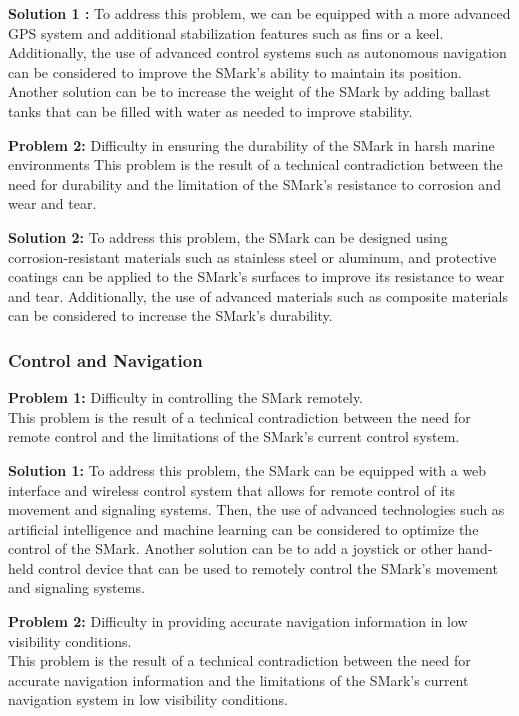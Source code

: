 \documentclass[12pt, twoside]{report}
\begin{document}
\textbf{Solution 1 :} To address this problem, we can be equipped with a more advanced GPS system and additional stabilization features such as fins or a keel. Additionally, the use of advanced control systems such as autonomous navigation can be considered to improve the SMark’s ability to maintain its position. Another solution can be to increase the weight of the SMark by adding ballast tanks that can be filled with water as needed to improve stability.

\textbf{Problem 2:} Difficulty in ensuring the durability of the SMark in harsh marine environments
This problem is the result of a technical contradiction between the need for durability and the limitation of the SMark's resistance to corrosion and wear and tear.

\textbf{Solution 2:} To address this problem, the SMark can be designed using corrosion-resistant materials such as stainless steel or aluminum, and protective coatings can be applied to the SMark's surfaces to improve its resistance to wear and tear. Additionally, the use of advanced materials such as composite materials can be considered to increase the SMark's durability.


\subsubsection{Control and Navigation}

\textbf{Problem 1:} Difficulty in controlling the SMark remotely.\\
This problem is the result of a technical contradiction between the need for remote control and the limitations of the SMark's current control system.

\textbf{Solution 1:} To address this problem, the SMark can be equipped with a web interface and wireless control system that allows for remote control of its movement and signaling systems. Then, the use of advanced technologies such as artificial intelligence and machine learning can be considered to optimize the control of the SMark. Another solution can be to add a joystick or other hand-held control device that can be used to remotely control the SMark’s movement and signaling systems.

\textbf{Problem 2:} Difficulty in providing accurate navigation information in low visibility conditions.\\
This problem is the result of a technical contradiction between the need for accurate navigation information and the limitations of the SMark's current navigation system in low visibility conditions.
\end{document}
